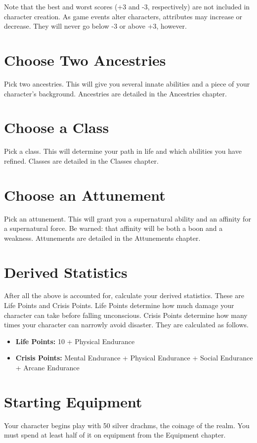 \begin{multicols}{2}
Note that the best and worst scores (+3 and -3, respectively) are not 
included in character creation. As game events alter characters, 
attributes may increase or decrease. They will never go below -3 or
above +3, however.

\section{Choose Two Ancestries}

Pick two ancestries. This will give you several innate abilities 
and a piece of your character's background. Ancestries are detailed
in the Ancestries chapter.

\section{Choose a Class}

Pick a class. This will determine your path in life and which 
abilities you have refined. Classes are detailed in the Classes
chapter.

\section{Choose an Attunement}

Pick an attunement. This will grant you a supernatural ability 
and an affinity for a supernatural force. Be warned: that 
affinity will be both a boon and a weakness. Attunements are
detailed in the Attunements chapter.

\section{Derived Statistics}

After all the above is accounted for, calculate your derived 
statistics. These are Life Points and Crisis Points. Life Points 
determine how much damage your character can take before falling 
unconscious. Crisis Points determine how many times your character 
can narrowly avoid disaster. They are calculated as follows.

\begin{itemize}
    \item \textbf{Life Points:} 10 + Physical Endurance
    \item \textbf{Crisis Points:} Mental Endurance + Physical Endurance + Social Endurance + Arcane Endurance
\end{itemize}

\section{Starting Equipment}

Your character begins play with 50 silver drachms, the coinage of 
the realm. You must spend at least half of it on equipment from the 
Equipment chapter.

\end{multicols}
